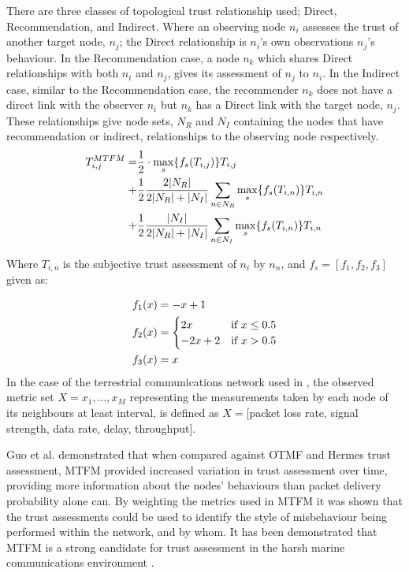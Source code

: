 \documentclass{aamas2016}
\begin{document}
There are three classes of topological trust relationship used; Direct, Recommendation, and Indirect.
Where an observing node $n_i$ assesses the trust of another target node, $n_j$; the Direct relationship is $n_i$'s own observations $n_j$'s behaviour.
In the Recommendation case, a node $n_k$ which shares Direct relationships with both $n_i$ and $n_j$, gives its assessment of $n_j$ to $n_i$.
In the Indirect case, similar to the Recommendation case, the recommender $n_k$ does not have a direct link with the observer $n_i$ but $n_k$ has a Direct link with the target node, $n_j$.
These relationships give node sets, $N_R$ and $N_I$ containing the nodes that have recommendation or indirect, relationships to the observing node respectively.
%
\begin{align}
\label{eq:networkeffects}
T_{i,j}^{MTFM}=&\frac{1}{2} \cdot \max_s\{f_s(T_{i,j})\} T_{i,j}\\ \notag
+&\frac{1}{2} \frac{2|N_R| }{2|N_R| + |N_I|}\sum_{n \in N_R} \max_s\{f_s(T_{i,n})\} T_{i,n}\\ \notag
+&\frac{1}{2} \frac{|N_I| }{2|N_R| + |N_I|}\sum_{n \in N_I} \max_s\{f_s(T_{i,n})\} T_{i,n} 
\end{align}

Where $T_{i,n}$ is the subjective trust assessment of $n_i$ by $n_n$, and $f_s = [ f_1,f_2, f_3]$ given as:

\begin{align}
\label{eq:whitenization}
f_1(x)&= -x+1\notag\\
f_2(x)&= 
\begin{cases}
2x & \text{if }x\leq 0.5\\
-2x+2 & \text{if }x>0.5
\end{cases}\\
f_3(x)&= x\notag
\end{align}
%
In the case of the terrestrial communications network used in \cite{Guo11}, the observed metric set $X = {x_1,\dots,x_M}$ representing the measurements taken by each node of its neighbours at least interval, is defined as $X=[$packet loss rate, signal strength, data rate, delay, throughput$]$.

Guo et al. demonstrated that when compared against OTMF and Hermes trust assessment, MTFM provided increased variation in trust assessment over time, providing more information about the nodes' behaviours than packet delivery probability alone can.
By weighting the metrics used in MTFM it was shown that the trust assessments could be used to identify the style of misbehaviour being performed within the network, and by whom.
It has been demonstrated that MTFM is a strong candidate for trust assessment in the harsh marine communications environment \cite{Bolster2015b}.
\end{document}
